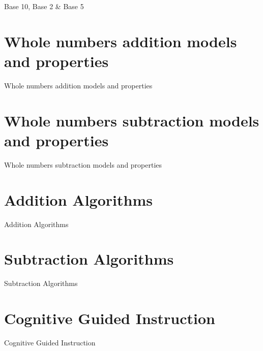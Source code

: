 Base 10, Base 2 \& Base 5

\section{Whole numbers addition models and properties}
\label{sec:whole-numbers-addition-models-and-properties}

Whole numbers addition models and properties

\section{Whole numbers subtraction models and properties}
\label{sec:whole-numbers-subtraction-models-and-properties}

Whole numbers subtraction models and properties

\section{Addition Algorithms}
\label{sec:addition-algorithms}

Addition Algorithms

\section{Subtraction Algorithms}
\label{sec:subtraction-algorithms}

Subtraction Algorithms

\section{Cognitive Guided Instruction}
\label{sec:cognitive-guided-instruction}

Cognitive Guided Instruction

